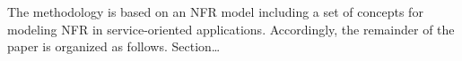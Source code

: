
 The methodology is based on  an NFR model including a set of concepts  for  modeling  NFR in service-oriented applications.
Accordingly, the remainder of the paper is organized as follows.
Section\dots





